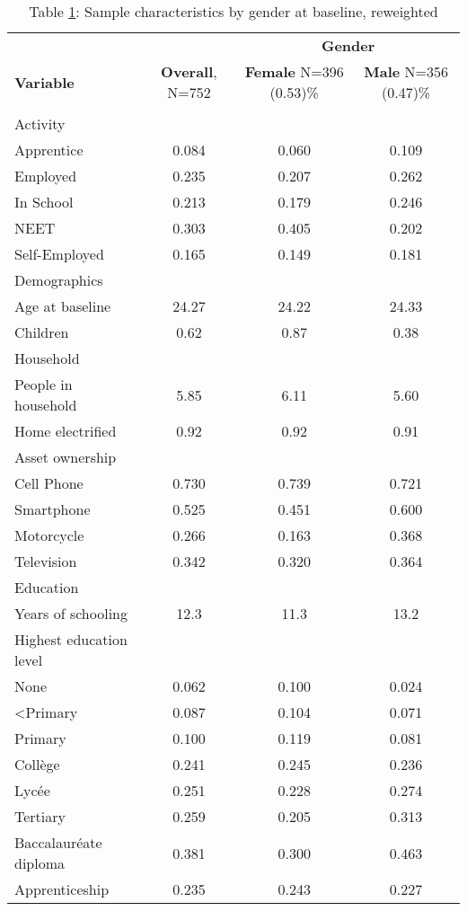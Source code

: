 \captionsetup[table]{labelformat=empty,skip=1pt}
\begin{longtable}{lccc}
\caption{Table \ref{tbl:gendergentable}: Sample characteristics by gender at baseline, reweighted}\label{tbl:gendergentable} \\
\toprule
& & \multicolumn{2}{c}{\textbf{Gender}} \\ 
 \cmidrule(lr){3-4}
\textbf{Variable} & \textbf{Overall}, N=752 & \textbf{Female} N=396 (0.53)\% & \textbf{Male} N=356 (0.47)\% \\ 
\midrule
\multicolumn{1}{l}{} \\ 
\midrule
Activity &  &  &  \\ 
\midrule
Apprentice & 0.084 & 0.060 & 0.109 \\ 
Employed & 0.235 & 0.207 & 0.262 \\ 
In School & 0.213 & 0.179 & 0.246 \\ 
NEET & 0.303 & 0.405 & 0.202 \\ 
Self-Employed & 0.165 & 0.149 & 0.181 \\ 
\midrule
\multicolumn{1}{l}{Demographics} \\ 
\midrule
Age at baseline & 24.27 & 24.22 & 24.33 \\ 
Children & 0.62 & 0.87 & 0.38 \\ 
\midrule
\multicolumn{1}{l}{Household} \\ 
\midrule
People in household & 5.85 & 6.11 & 5.60 \\ 
Home electrified & 0.92 & 0.92 & 0.91 \\ 
\midrule
\multicolumn{1}{l}{Asset ownership} \\ 
\midrule
Cell Phone & 0.730 & 0.739 & 0.721 \\ 
Smartphone & 0.525 & 0.451 & 0.600 \\ 
Motorcycle & 0.266 & 0.163 & 0.368 \\ 
Television & 0.342 & 0.320 & 0.364 \\ 
\midrule
\multicolumn{1}{l}{Education} \\ 
\midrule
Years of schooling & 12.3 & 11.3 & 13.2 \\ 
Highest education level &  &  &  \\ 
None & 0.062 & 0.100 & 0.024 \\ 
<Primary & 0.087 & 0.104 & 0.071 \\ 
Primary & 0.100 & 0.119 & 0.081 \\ 
Collège & 0.241 & 0.245 & 0.236 \\ 
Lycée & 0.251 & 0.228 & 0.274 \\ 
Tertiary & 0.259 & 0.205 & 0.313 \\ 
Baccalauréate diploma & 0.381 & 0.300 & 0.463 \\ 
Apprenticeship & 0.235 & 0.243 & 0.227 \\ 
\bottomrule
\end{longtable}